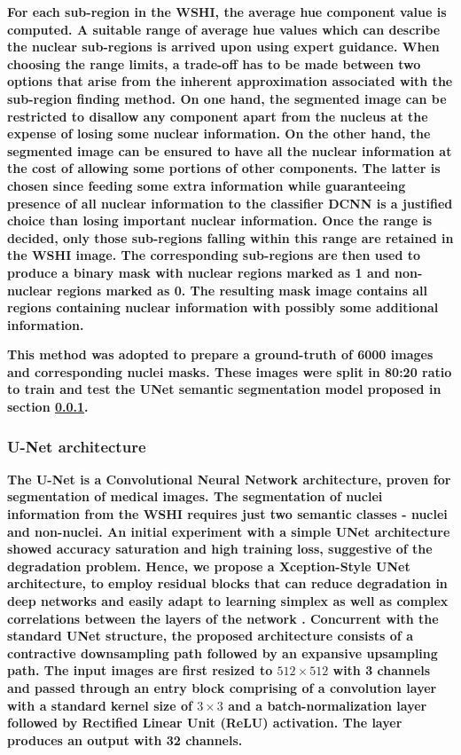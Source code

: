 \documentclass{comjnl}
\begin{document}
\textbf{
For each sub-region in the WSHI, the average hue component value is computed. A suitable range of average hue values which can describe the nuclear sub-regions is arrived upon using expert guidance. When choosing the range limits, a trade-off has to be made between two options that arise from the inherent approximation associated with the sub-region finding method. On one hand, the segmented image can be restricted to disallow any component apart from the nucleus at the expense of losing some nuclear information. On the other hand, the segmented image can be ensured to have all the nuclear information at the cost of allowing some portions of other components. The latter is chosen since feeding some extra information while guaranteeing presence of all nuclear information to the classifier DCNN is a justified choice than losing important nuclear information. Once the range is decided, only those sub-regions falling within this range are retained in the WSHI image. The corresponding sub-regions are then used to produce a binary mask with nuclear regions marked as 1 and non-nuclear regions marked as 0. The resulting mask image contains all regions containing nuclear information with possibly some additional information. 
}

\textbf{
This method was adopted to prepare a ground-truth of 6000 images and corresponding nuclei masks. These images were split in 80:20 ratio to train and test the UNet semantic segmentation model proposed in section \ref{sect_unet_arch}. 
}

\subsubsection{U-Net architecture}
\label{sect_unet_arch}

\textbf{
The U-Net \cite{jonathan} is a Convolutional Neural Network architecture, proven for segmentation of medical images. The segmentation of nuclei information from the WSHI requires just two semantic classes - nuclei and non-nuclei. An initial experiment with a simple UNet architecture showed accuracy saturation and high training loss, suggestive of the degradation problem. Hence, we propose a Xception-Style \cite{chollet} UNet architecture, to employ residual blocks that can reduce degradation in deep networks and easily adapt to learning simplex as well as complex correlations between the layers of the network \cite{veit}. Concurrent with the standard UNet structure, the proposed architecture consists of a contractive downsampling path followed by an expansive upsampling path. The input images are first resized to $512\times512$ with 3 channels and passed through an entry block comprising of a convolution layer with a standard kernel size of $3\times3$ and a batch-normalization layer followed by Rectified Linear Unit (ReLU) activation. The layer produces an output with 32 channels.
}
\end{document}
